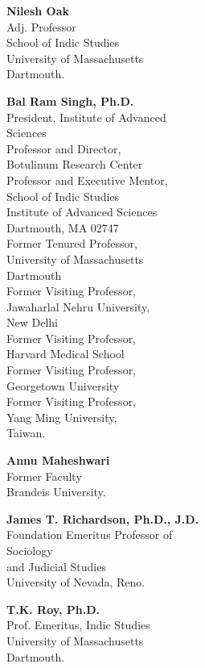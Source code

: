 \begin{multicols}{2}
\begin{trivlist}
\item \textbf{Nilesh Oak}\\ 
Adj. Professor\\
School of Indic Studies\\
University of Massachusetts\\ Dartmouth.
 
\item \textbf{Bal Ram Singh, Ph.D.}\\ 
President, Institute of Advanced\\ Sciences\\[2pt]
Professor and Director,\\ 
Botulinum Research Center\\[2pt]
Professor and Executive Mentor,\\ 
School of Indic Studies\\
Institute of Advanced Sciences\\
Dartmouth, MA 02747\\[2pt]
Former Tenured Professor,\\ 
University of Massachusetts\\ Dartmouth\\[2pt]
Former Visiting Professor,\\ 
Jawaharlal Nehru University,\\ 
New Delhi\\[2pt]
Former Visiting Professor,\\ 
Harvard Medical School\\[2pt]
Former Visiting Professor,\\ 
Georgetown University\\[2pt]
Former Visiting Professor,\\ 
Yang Ming University,\\ 
Taiwan.
 
\item \textbf{Annu Maheshwari}\\ 
Former Faculty\\
Brandeis University.
 
\item \textbf{James T. Richardson, Ph.D., J.D.}\\ 
Foundation Emeritus Professor of\\ Sociology\\ 
and Judicial Studies\\
University of Nevada, Reno.
 
\item \textbf{T.K. Roy, Ph.D.}\\ 
Prof. Emeritus, Indic Studies\\
University of Massachusetts\\
Dartmouth.
 

\end{trivlist}
\end{multicols}
